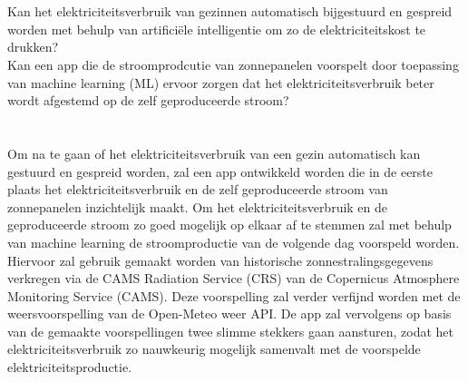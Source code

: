\section{}%
\label{sec:onderzoeksvraag}


Kan het elektriciteitsverbruik van gezinnen automatisch bijgestuurd en gespreid worden met behulp van artificiële intelligentie om zo de elektriciteitskost te drukken? \\

Kan een app die de stroomprodcutie van zonnepanelen voorspelt door toepassing van machine learning (ML) ervoor zorgen dat het elektriciteitsverbruik beter wordt afgestemd op de zelf geproduceerde stroom?

\section{}%
\label{sec:onderzoeksdoelstelling}


Om na te gaan of het elektriciteitsverbruik van een gezin automatisch kan gestuurd en gespreid worden, zal een app ontwikkeld worden die in de eerste plaats het elektriciteitsverbruik en de zelf geproduceerde stroom van zonnepanelen inzichtelijk maakt. Om het elektriciteitsverbruik en de geproduceerde stroom zo goed mogelijk op elkaar af te stemmen zal met behulp van machine learning de stroomproductie van de volgende dag voorspeld worden. Hiervoor zal gebruik gemaakt worden van historische zonnestralingsgegevens verkregen via de CAMS Radiation Service (CRS) van de Copernicus Atmosphere Monitoring Service (CAMS). Deze voorspelling zal verder verfijnd worden met de weersvoorspelling van de Open-Meteo weer API. De app zal vervolgens op basis van de gemaakte voorspellingen twee slimme stekkers gaan aansturen, zodat het elektriciteitsverbruik zo nauwkeurig mogelijk samenvalt met de voorspelde elektriciteitsproductie. 

